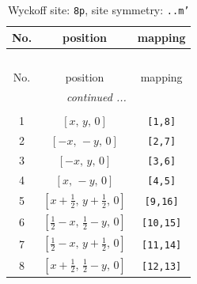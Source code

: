 \documentclass[fleqn,8pt]{jsarticle}
\begin{document}
\begin{longtable}{ccc}
\caption{Wyckoff site: {\tt 8p}, site symmetry: {\tt ..m'}}
 \\
 \hline \hline
No. & position & mapping \\ \hline \endfirsthead

\multicolumn{2}{l}{\tablename\ \thetable{}} \\
 \hline \hline
No. & position & mapping \\ \hline \endhead

 \hline \hline
\multicolumn{2}{r}{\footnotesize\it continued ...} \\ \endfoot

 \hline \hline
\multicolumn{2}{r}{} \\ \endlastfoot

1 & $\left[ x,\, y,\, 0 \right]$ & {\tt [1,8]} \\ \hline
2 & $\left[ - x,\, - y,\, 0 \right]$ & {\tt [2,7]} \\ \hline
3 & $\left[ - x,\, y,\, 0 \right]$ & {\tt [3,6]} \\ \hline
4 & $\left[ x,\, - y,\, 0 \right]$ & {\tt [4,5]} \\ \hline
5 & $\left[ x + \frac{1}{2},\, y + \frac{1}{2},\, 0 \right]$ & {\tt [9,16]} \\ \hline
6 & $\left[ \frac{1}{2} - x,\, \frac{1}{2} - y,\, 0 \right]$ & {\tt [10,15]} \\ \hline
7 & $\left[ \frac{1}{2} - x,\, y + \frac{1}{2},\, 0 \right]$ & {\tt [11,14]} \\ \hline
8 & $\left[ x + \frac{1}{2},\, \frac{1}{2} - y,\, 0 \right]$ & {\tt [12,13]} \\
\end{longtable}
\renewcommand{\arraystretch}{1.2}
\end{document}
